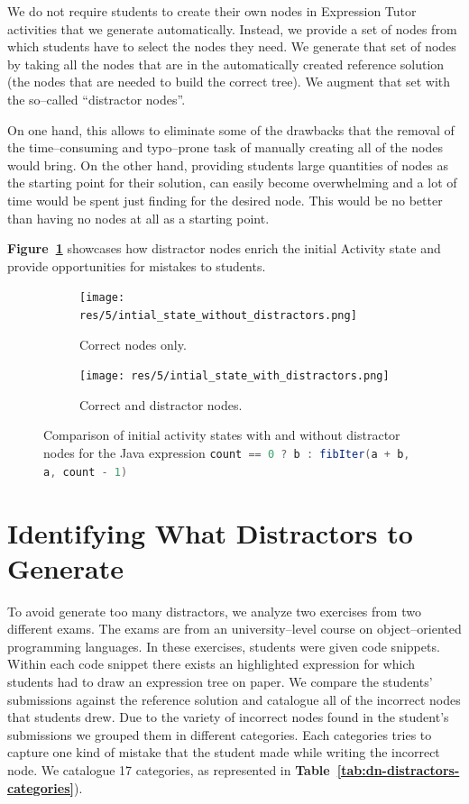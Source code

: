 \begin{chapterBody}
We do not require students to create their own nodes in Expression Tutor
activities that we generate automatically. Instead, we provide a set of nodes
from which students have to select the nodes they need. We generate that set of
nodes by taking all the nodes that are in the automatically created reference
solution (the nodes that are needed to build the correct tree). We augment that
set with the so–called ``distractor nodes''.

On one hand, this allows to eliminate some of the drawbacks that the removal of
the \hfill\break time–consuming and typo–prone task of manually creating all of
the nodes would bring.
On the other hand, providing students large quantities of nodes as the starting
point for their solution, can easily become overwhelming and a lot of time would
be spent just finding for the desired node. This would be no better than having 
no nodes at all as a starting point.

\textbf{Figure~\ref{fig:dn-initial-state-diff}} showcases how distractor nodes
enrich the initial Activity state and provide opportunities for mistakes to 
students.

\begin{figure}[ht]
    \centering
    \begin{subfigure}[b]{0.45\textwidth}
    \texttt{[image: res/5/intial\_state\_without\_distractors.png]}
    \caption{Correct nodes only.}
    \end{subfigure}
    \begin{subfigure}[b]{0.45\textwidth}
    \texttt{[image: res/5/intial\_state\_with\_distractors.png]}
    \caption{Correct and distractor nodes.}
    \end{subfigure}
    \caption{Comparison of initial activity states with and without distractor
nodes for the Java expression
\lstinline[language=Java]{count == 0 ? b : fibIter(a + b, a, count - 1)}}
    \label{fig:dn-initial-state-diff}
\end{figure}

\section{Identifying What Distractors to Generate}\label{sec:dn-id}

To avoid generate too many distractors, we analyze two exercises from two
different exams.
The exams are from an university–level course on object–oriented programming
languages.
In these exercises, students were given code snippets. Within each code
snippet there exists an highlighted expression for which students
had to draw an expression tree on paper.
We compare the students' submissions against the reference solution
and catalogue all of the incorrect nodes that students drew.
Due to the variety of incorrect nodes found in the student's submissions
we grouped them in different categories. Each categories tries to capture one
kind of mistake that the student made while writing the incorrect node.
We catalogue 17 categories, as represented in
\textbf{Table~\ref{tab:dn-distractors-categories}}).


\end{chapterBody}
